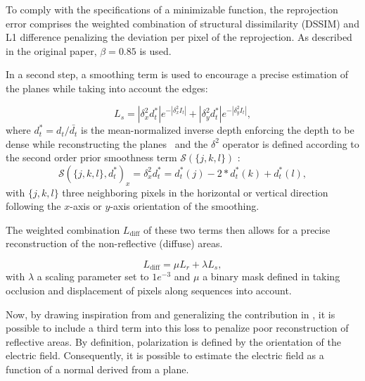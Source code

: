 To comply with the specifications of a minimizable function, the reprojection error comprises the weighted combination of structural dissimilarity (DSSIM) and L1 difference penalizing the deviation per pixel of the reprojection. As described in the original paper, $\beta = 0.85$ is used.


In a second step, a smoothing term is used to encourage a precise estimation of the planes while taking into account the edges:

\begin{equation}
L_s = |\delta^2_xd_t^*| e^{-|\delta^2_x I_t|} + |\delta^2_yd_t^*| e^{-|\delta^2_y I_t|},
\end{equation}
where $d_t^* = d_t / \bar{d_t}$ is the mean-normalized inverse depth enforcing the depth to be dense while reconstructing the planes~\cite{wang2018learning} and the $\delta^2$ operator is defined according to the second order prior smoothness term $\mathcal{S}(\{j,k,l\})$ \cite{Woodford2008GlobalPriors}:
\begin{equation}
\mathcal{S}(\{j,k,l\},d_t^*)_x = \delta^2_x d_t^* = d_t^*(j) - 2* d_t^*(k) + d_t^*(l),
\end{equation}
with $\{j, k, l\}$ three neighboring pixels in the horizontal or vertical direction following the $x$-axis or $y$-axis orientation of the smoothing.

The weighted combination $L_{\textrm{diff}}$ of these two terms then allows for a precise reconstruction of the non-reflective (diffuse) areas.


\begin{equation}
L_{\textrm{diff}} = \mu L_r + \lambda L_s,
\end{equation}
with $\lambda$ a scaling parameter set to $1e^{-3}$ and $\mu$ a binary mask defined in \cite{godard2019digging} taking occlusion and displacement of pixels along sequences into account.

Now, by drawing inspiration from and generalizing the contribution in \cite{berger2017depth}, it is possible to include a third term into this loss to penalize poor reconstruction of reflective areas. By definition, polarization is defined by the orientation of the electric field. Consequently, it is possible to estimate the electric field as a function of a normal derived from a plane.

